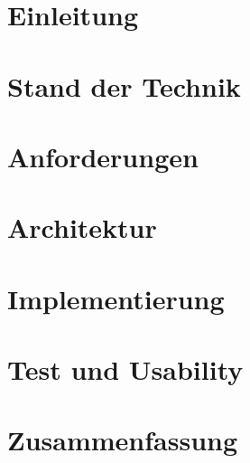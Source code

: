 \newpage
\section{Einleitung}

\section{Stand der Technik}

\section{Anforderungen}

\section{Architektur}

\section{Implementierung}

\section{Test und Usability}

\section{Zusammenfassung}